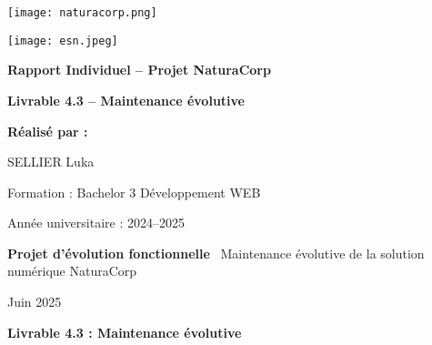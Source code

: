 \documentclass[a4paper,12pt]{report}
\begin{document}
\thispagestyle{empty}
\begin{center}
    \begin{minipage}{0.45\textwidth}
        \centering
        \texttt{[image: naturacorp.png]}
        \vspace{0.3cm}
    \end{minipage}
    \hfill
    \begin{minipage}{0.45\textwidth}
        \centering
        \texttt{[image: esn.jpeg]}
        \vspace{0.3cm}
    \end{minipage}
    \vspace*{0.5cm}
    
    {\Huge\bfseries\color{naturacorpgreen} Rapport Individuel – Projet NaturaCorp\par}
    \vspace{1.2cm}
    
    {\LARGE\bfseries Livrable 4.3 – Maintenance évolutive\par}
    \vspace{2cm}
    
    {\Large\bfseries Réalisé par :\par}
    \vspace{0.3cm}
    {\Large SELLIER Luka\par}
    \vspace{0.5cm}
    {\large Formation : Bachelor 3 Développement WEB\par}
    \vspace{0.3cm}
    \vspace{0.3cm}
    {\large Année universitaire : 2024--2025\par}
    \vspace{1.5cm}
    
    \begin{minipage}{0.8\textwidth}
        \centering
        \textbf{Projet d’évolution fonctionnelle}\
        \vspace{0.2cm}
        Maintenance évolutive de la solution numérique NaturaCorp
    \end{minipage}
    \vspace{1.5cm}
    
    {\large Juin 2025\par}
\vspace*{\fill}
\begin{center}
    \textbf{Livrable 4.3 : Maintenance évolutive}
\end{center}
\end{center}
\end{document}
